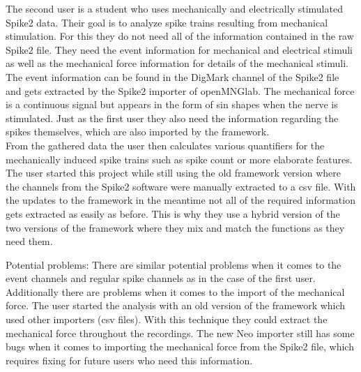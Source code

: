 The second user is a student who uses mechanically and electrically stimulated Spike2 data. Their goal is to analyze spike trains resulting from mechanical stimulation. For this they do not need all of the information contained in the raw Spike2 file. They need the event information for mechanical and electrical stimuli as well as the mechanical force information for details of the mechanical stimuli. The event information can be found in the DigMark channel of the Spike2 file and gets extracted by the Spike2 importer of openMNGlab. The mechanical force is a continuous signal but appears in the form of sin shapes when the nerve is stimulated.
Just as the first user they also need the information regarding the spikes themselves, which are also imported by the framework.\\
From the gathered data the user then calculates various quantifiers for the mechanically induced spike trains such as spike count or more elaborate features. The user started this project while still using the old framework version where the channels from the Spike2 software were manually extracted to a csv file. With the updates to the framework in the meantime not all of the required information gets extracted as easily as before. This is why they use a hybrid version of the two versions of the framework where they mix and match the functions as they need them.

Potential problems: There are similar potential problems when it comes to the event channels and regular spike channels as in the case of the first user. Additionally there are problems when it comes to the import of the mechanical force. The user started the analysis with an old version of the framework which used other importers (csv files). With this technique they could extract the mechanical force throughout the recordings. The new Neo importer still has some bugs when it comes to importing the mechanical force from the Spike2 file, which requires fixing for future users who need this information.

